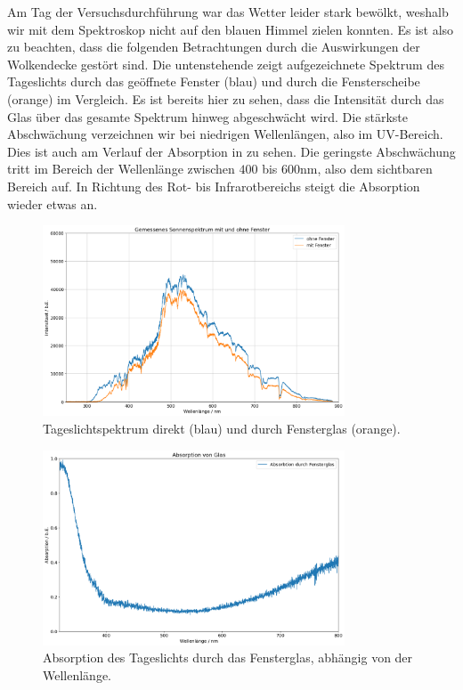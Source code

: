 Am Tag der Versuchsdurchführung war das Wetter leider stark bewölkt, weshalb wir mit dem Spektroskop nicht auf den blauen Himmel zielen konnten. Es ist also zu beachten, dass die folgenden Betrachtungen durch die Auswirkungen der Wolkendecke gestört sind. Die untenstehende  zeigt aufgezeichnete Spektrum des Tageslichts durch das geöffnete Fenster (blau) und durch die Fensterscheibe (orange) im Vergleich. Es ist bereits hier zu sehen, dass die Intensität durch das Glas über das gesamte Spektrum hinweg abgeschwächt wird. Die stärkste Abschwächung verzeichnen wir bei niedrigen Wellenlängen, also im UV-Bereich. Dies ist auch am Verlauf der Absorption in  zu sehen. Die geringste Abschwächung tritt im Bereich der Wellenlänge zwischen $400$ bis $600\si{\nano\meter}$, also dem sichtbaren Bereich auf. In Richtung des Rot- bis Infrarotbereichs steigt die Absorption wieder etwas an.

\begin{figure}[H]
  \centering
  \includegraphics[width=0.8\textwidth]{files/plots/himmel_m_o_g.png}
  \caption{Tageslichtspektrum direkt (blau) und durch Fensterglas (orange).}
  \label{fig:himmel_m_o_g}
\end{figure}

\begin{figure}[H]
  \centering
  \includegraphics[width=0.8\textwidth]{files/plots/absorption_glas.png}
  \caption{Absorption des Tageslichts durch das Fensterglas, abhängig von der Wellenlänge.}
  \label{fig:absorption_glas}
\end{figure}

